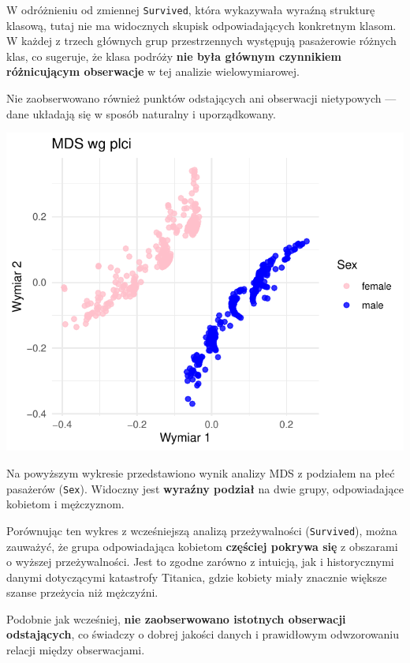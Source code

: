\documentclass[
  12pt,
]{article}
\begin{document}
W odróżnieniu od zmiennej \texttt{Survived}, która wykazywała wyraźną
strukturę klasową, tutaj nie ma widocznych skupisk odpowiadających
konkretnym klasom. W każdej z trzech głównych grup przestrzennych
występują pasażerowie różnych klas, co sugeruje, że klasa podróży
\textbf{nie była głównym czynnikiem różnicującym obserwacje} w tej
analizie wielowymiarowej.

Nie zaobserwowano również punktów odstających ani obserwacji nietypowych
--- dane układają się w sposób naturalny i uporządkowany.

\begin{center}\includegraphics{Sprawozdanie2_files/figure-latex/wyk3-1} \end{center}

Na powyższym wykresie przedstawiono wynik analizy MDS z podziałem na
płeć pasażerów (\texttt{Sex}). Widoczny jest \textbf{wyraźny podział} na
dwie grupy, odpowiadające kobietom i mężczyznom.

Porównując ten wykres z wcześniejszą analizą przeżywalności
(\texttt{Survived}), można zauważyć, że grupa odpowiadająca kobietom
\textbf{częściej pokrywa się} z obszarami o wyższej przeżywalności. Jest
to zgodne zarówno z intuicją, jak i historycznymi danymi dotyczącymi
katastrofy Titanica, gdzie kobiety miały znacznie większe szanse
przeżycia niż mężczyźni.

Podobnie jak wcześniej, \textbf{nie zaobserwowano istotnych obserwacji
odstających}, co świadczy o dobrej jakości danych i prawidłowym
odwzorowaniu relacji między obserwacjami.
\end{document}
